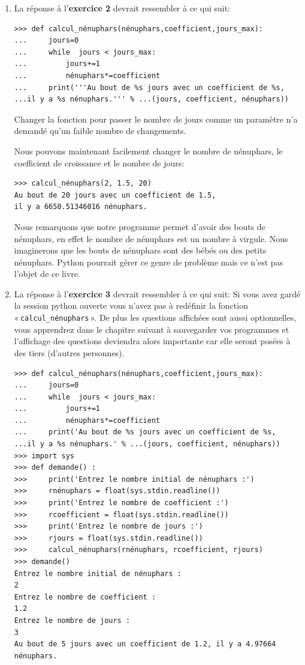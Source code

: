 \begin{enumerate}
\item La réponse à l'\textbf{exercice 2} devrait ressembler à ce qui suit: 
\begin{Verbatim}[frame=single,rulecolor=\color{mbleu}, label=à taper]
>>> def calcul_nénuphars(nénuphars,coefficient,jours_max):
...     jours=0
...     while  jours < jours_max:
...         jours+=1
...         nénuphars*=coefficient
...     print('''Au bout de %s jours avec un coefficient de %s, 
...il y a %s nénuphars.''' % ...(jours, coefficient, nénuphars))
\end{Verbatim}
Changer la fonction pour passer le nombre de jours comme un paramètre n'a demandé qu'un faible nombre de changements.

Nous pouvons maintenant facilement changer le nombre de nénuphars, le coefficient de croissance et le nombre de jours:

\begin{Verbatim}[frame=single,rulecolor=\color{mbleu}, label=à taper]
>>> calcul_nénuphars(2, 1.5, 20)
Au bout de 20 jours avec un coefficient de 1.5, 
il y a 6650.51346016 nénuphars.
\end{Verbatim}
Nous remarquons que notre programme permet d'avoir des bouts de nénuphars, en effet le nombre de nénuphars est un nombre à virgule. Nous imaginerons que les bouts de nénuphars sont des bébés ou des petits nénuphars. Python pourrait gérer ce genre de problème mais ce n'est pas l'objet de ce livre.

\item La réponse à l'\textbf{exercice 3} devrait ressembler à ce qui suit: 
Si vous avez gardé la session python ouverte vous n'avez pas à redéfinir la fonction « \texttt{calcul\_nénuphars} ». De plus les questions affichées sont aussi optionnelles, vous apprendrez dans le chapitre suivant à sauvegarder vos programmes et l'affichage des questions deviendra alors importante car elle seront posées à des tiers (d'autres personnes).

\begin{Verbatim}[frame=single,rulecolor=\color{mbleu}, label=à taper]
>>> def calcul_nénuphars(nénuphars,coefficient,jours_max):
...     jours=0
...     while  jours < jours_max:
...         jours+=1
...         nénuphars*=coefficient
...     print('Au bout de %s jours avec un coefficient de %s, 
...il y a %s nénuphars.' % ...(jours, coefficient, nénuphars))
>>> import sys
>>> def demande() : 
>>>     print('Entrez le nombre initial de nénuphars :')
>>>     rnénuphars = float(sys.stdin.readline())
>>>     print('Entrez le nombre de coefficient :')
>>>     rcoefficient = float(sys.stdin.readline())
>>>     print('Entrez le nombre de jours :')
>>>     rjours = float(sys.stdin.readline())
>>>     calcul_nénuphars(rnénuphars, rcoefficient, rjours)
>>> demande()
Entrez le nombre initial de nénuphars :
2
Entrez le nombre de coefficient :
1.2
Entrez le nombre de jours :
3
Au bout de 5 jours avec un coefficient de 1.2, il y a 4.97664 nénuphars.\end{Verbatim}
\end{enumerate}

